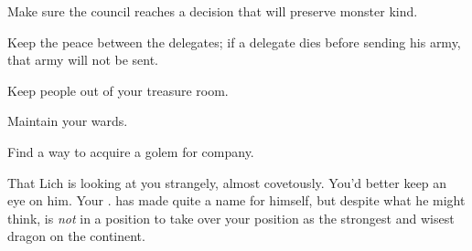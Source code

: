 \documentclass[char]{guildcamp2}
\begin{document}
	
	
	\begin{itemz}[Goals]
  \item Make sure the council reaches a decision that will preserve monster kind.
	\item Keep the peace between the delegates; if a delegate dies before sending  his army, that army will not be sent.
	\item Keep people out of your treasure room.
	\item Maintain your wards.
		\item Find a way to acquire a golem for company.
\end{itemz}

\begin{contacts}
  \contact{\cLich{}} That Lich is looking at you strangely, almost covetously. You'd better keep an eye on him.
	\contact{\cRed{}} Your \cRed{\offspring}. \cRed{\They} has made quite a name for himself, but despite what he might think, is \emph{not} in a position to take over your position as the strongest and wisest dragon on the continent.
\end{contacts}
\end{document}
